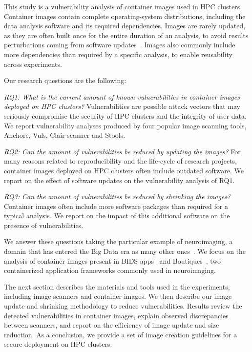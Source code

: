 \documentclass[a4paper,num-refs]{oup-contemporary}
\begin{document}
This study is a vulnerability analysis of container images used in HPC
clusters. Container images contain complete operating-system distributions,
including the data analysis software and its required dependencies.
Images are rarely updated, as they are often built once
for the entire duration of an analysis, to avoid results perturbations
coming from software updates~\cite{gronenschild2012effects, glatard2015reproducibility}. Images also
commonly include more dependencies than required by a specific analysis, to 
enable reusability across experiments.

Our research questions are the following:

\textit{RQ1: What is the current amount of known vulnerabilities in
container images deployed on HPC clusters?} Vulnerabilities are possible
attack vectors that may seriously compromise the security of HPC clusters
and the integrity of user data. We report vulnerability analyses produced
by four popular image scanning tools, Anchore, Vuls, Clair-scanner and Stools.

\textit{RQ2: Can the amount of vulnerabilities be reduced by updating the images?}  
For many reasons related to reproducibility and the life-cycle of research
projects, container images deployed on HPC clusters often include outdated
software. We report on the effect of software updates on the vulnerability
analysis of RQ1.

\textit{RQ3: Can the amount of vulnerabilities be reduced by shrinking the images?} 
Container images often include more software packages than required for a
typical analysis. We report on the impact of this additional software on
the presence of vulnerabilities.

We answer these questions taking the particular example of neuroimaging, a
domain that has entered the Big Data era as many other
ones~\cite{van2014human}. We focus on the analysis of container images
present in BIDS apps~\cite{gorgolewski2017bids} and Boutiques~\cite{glatard2018boutiques}, two containerized
application frameworks commonly used in neuroimaging. 


The next section describes the materials and tools used in the experiments,
including image scanners and container images. We then describe our image
update and shrinking methodology to reduce vulnerabilities. Results review
the detected vulnerabilities in container images, explain observed
discrepancies between scanners, and report on the efficiency of image
update and size reduction. As a conclusion, we provide a set of image
creation guidelines for a secure deployment on HPC clusters.
\end{document}
